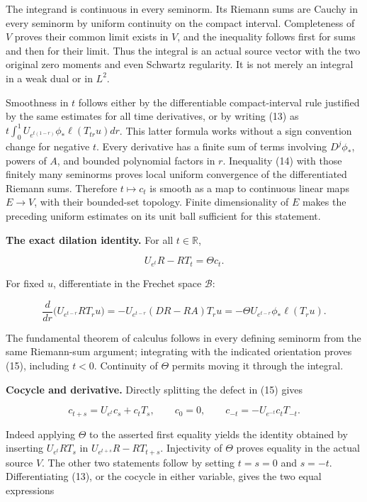 The integrand is continuous in every seminorm. Its Riemann sums are
Cauchy in every seminorm by uniform continuity on the compact interval.
Completeness of \(V\) proves their common limit exists in \(V\), and the
inequality follows first for sums and then for their limit. Thus the
integral is an actual source vector with the two original zero moments
and even Schwartz regularity. It is not merely an integral in a weak
dual or in \(L^2\).

Smoothness in \(t\) follows either by the differentiable
compact-interval rule justified by the same estimates for all time
derivatives, or by writing (13) as
\(t\int_0^1 U_{e^{t(1-r)}}\phi_*\ell(T_{tr}u)dr\). This latter formula
works without a sign convention change for negative \(t\). Every
derivative has a finite sum of terms involving \(D^j\phi_*\), powers of
\(A\), and bounded polynomial factors in \(r\). Inequality (14) with
those finitely many seminorms proves local uniform convergence of the
differentiated Riemann sums. Therefore \(t\mapsto c_t\) is smooth as a
map to continuous linear maps \(E\to V\), with their bounded-set
topology. Finite dimensionality of \(E\) makes the preceding uniform
estimates on its unit ball sufficient for this statement.

\textbf{The exact dilation identity.} For all \(t\in\mathbb R\),

\[\boxed{U_{e^t}R-RT_t=\Theta c_t.}\tag{15}\]

For fixed \(u\), differentiate in the Frechet space \(\mathscr B\):

\[
\frac{d}{dr}\bigl(U_{e^{t-r}}RT_ru\bigr)
=-U_{e^{t-r}}(DR-RA)T_ru
=-\Theta U_{e^{t-r}}\phi_*\ell(T_ru).
\]

The fundamental theorem of calculus follows in every defining seminorm
from the same Riemann-sum argument; integrating with the indicated
orientation proves (15), including \(t<0\). Continuity of \(\Theta\)
permits moving it through the integral.

\textbf{Cocycle and derivative.} Directly splitting the defect in (15)
gives

\[
\boxed{c_{t+s}=U_{e^t}c_s+c_tT_s,\qquad
c_0=0,\qquad
c_{-t}=-U_{e^{-t}}c_tT_{-t}.}\tag{16}
\]

Indeed applying \(\Theta\) to the asserted first equality yields the
identity obtained by inserting \(U_{e^t}RT_s\) in
\(U_{e^{t+s}}R-RT_{t+s}\). Injectivity of \(\Theta\) proves equality in
the actual source \(V\). The other two statements follow by setting
\(t=s=0\) and \(s=-t\). Differentiating (13), or the cocycle in either
variable, gives the two equal expressions

